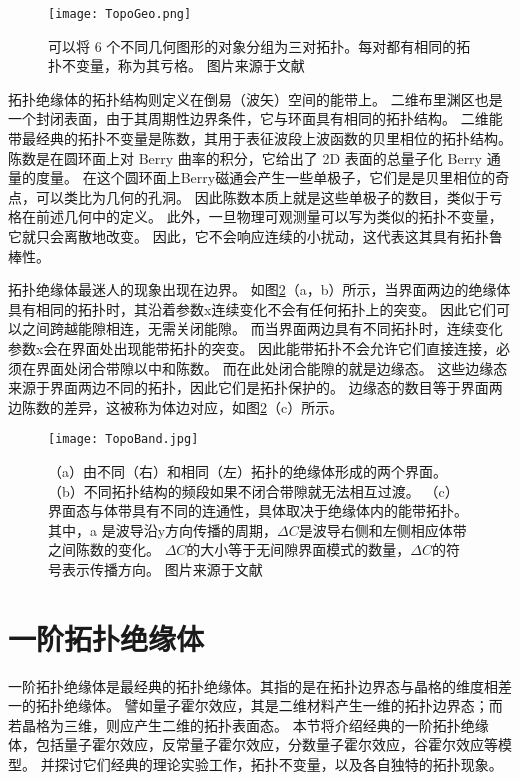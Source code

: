 \begin{figure}[htbp]
	\centering
	\texttt{[image: TopoGeo.png]}
 \caption{可以将 6 个不同几何图形的对象分组为三对拓扑。每对都有相同的拓扑不变量，称为其亏格。
图片来源于文献\cite{lu2014topological}}
 \label{fig:TopoGeo}
\end{figure}

拓扑绝缘体的拓扑结构则定义在倒易（波矢）空间的能带上。
二维布里渊区也是一个封闭表面，由于其周期性边界条件，它与环面具有相同的拓扑结构。
二维能带最经典的拓扑不变量是陈数，其用于表征波段上波函数的贝里相位的拓扑结构。
陈数是在圆环面上对 Berry 曲率的积分，它给出了 2D 表面的总量子化 Berry 通量的度量。
在这个圆环面上Berry磁通会产生一些单极子，它们是是贝里相位的奇点，可以类比为几何的孔洞。
因此陈数本质上就是这些单极子的数目，类似于亏格在前述几何中的定义。
此外，一旦物理可观测量可以写为类似的拓扑不变量，它就只会离散地改变。
因此，它不会响应连续的小扰动，这代表这其具有拓扑鲁棒性。

拓扑绝缘体最迷人的现象出现在边界。
如图\ref{fig:TopoBand}（a，b）所示，当界面两边的绝缘体具有相同的拓扑时，其沿着参数x连续变化不会有任何拓扑上的突变。
因此它们可以之间跨越能隙相连，无需关闭能隙。
而当界面两边具有不同拓扑时，连续变化参数x会在界面处出现能带拓扑的突变。
因此能带拓扑不会允许它们直接连接，必须在界面处闭合带隙以中和陈数。
而在此处闭合能隙的就是边缘态。
这些边缘态来源于界面两边不同的拓扑，因此它们是拓扑保护的。
边缘态的数目等于界面两边陈数的差异，这被称为体边对应，如图\ref{fig:TopoBand}（c）所示。
\begin{figure}[htbp]
	\centering
	\texttt{[image: TopoBand.jpg]}
 \caption{（a）由不同（右）和相同（左）拓扑的绝缘体形成的两个界面。
（b）不同拓扑结构的频段如果不闭合带隙就无法相互过渡。
（c）界面态与体带具有不同的连通性，具体取决于绝缘体内的能带拓扑。
 其中，a 是波导沿y方向传播的周期，$\Delta C$是波导右侧和左侧相应体带之间陈数的变化。
 $\Delta C$的大小等于无间隙界面模式的数量，$\Delta C$的符号表示传播方向。
图片来源于文献\cite{lu2014topological}}
 \label{fig:TopoBand}
\end{figure}

\section{一阶拓扑绝缘体}
一阶拓扑绝缘体是最经典的拓扑绝缘体。其指的是在拓扑边界态与晶格的维度相差一的拓扑绝缘体。
譬如量子霍尔效应，其是二维材料产生一维的拓扑边界态；而若晶格为三维，则应产生二维的拓扑表面态。
本节将介绍经典的一阶拓扑绝缘体，包括量子霍尔效应，反常量子霍尔效应，分数量子霍尔效应，谷霍尔效应等模型。
并探讨它们经典的理论实验工作，拓扑不变量，以及各自独特的拓扑现象。

